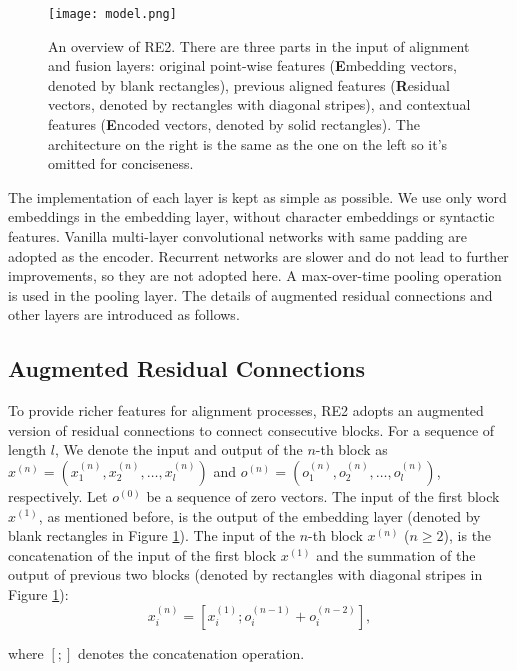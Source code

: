 \documentclass[11pt,a4paper]{article}
\begin{document}
\begin{figure}
  \texttt{[image: model.png]}  \caption{An overview of RE2. There are three parts in the input of alignment and fusion layers: original point-wise features (\textbf{E}mbedding vectors, denoted by blank rectangles), previous aligned features (\textbf{R}esidual vectors, denoted by rectangles with diagonal stripes), and contextual features (\textbf{E}ncoded vectors, denoted by solid rectangles). The architecture on the right is the same as the one on the left so it's omitted for conciseness.}
  \label{fig:model}
\end{figure}

The implementation of each layer is kept as simple as possible.
We use only word embeddings in the embedding layer, without character embeddings or syntactic features. Vanilla multi-layer convolutional networks with same padding \cite{collobert2011natural} are adopted as the encoder. Recurrent networks are slower and do not lead to further improvements, so they are not adopted here. A max-over-time pooling operation \cite{collobert2011natural} is used in the pooling layer. The details of augmented residual connections and other layers are introduced as follows.

\subsection{Augmented Residual Connections} \label{sec:a-res}
To provide richer features for alignment processes, RE2 adopts an augmented version of residual connections to connect consecutive blocks. 
For a sequence of length $l$, We denote the input and output of the $n$-th block as $x^{(n)} = (x_1^{(n)}, x_2^{(n)}, \dots, x_l^{(n)})$ and $o^{(n)} = (o_1^{(n)}, o_2^{(n)}, \dots, o_l^{(n)})$, respectively. Let $o^{(0)}$ be a sequence of zero vectors.
The input of the first block $x^{(1)}$, as mentioned before, is the output of the embedding layer (denoted by blank rectangles in Figure \ref{fig:model}). 
The input of the $n$-th block $x^{(n)}$ ($n\geq 2$), is the concatenation of the input of the first block $x^{(1)}$ and the summation of the output of previous two blocks (denoted by rectangles with diagonal stripes in Figure \ref{fig:model}):
\begin{equation}
x^{(n)}_i = [x^{(1)}_i;o^{(n-1)}_i + o^{(n-2)}_i],
\end{equation}

where $[ ; ]$ denotes the concatenation operation.
\end{document}
